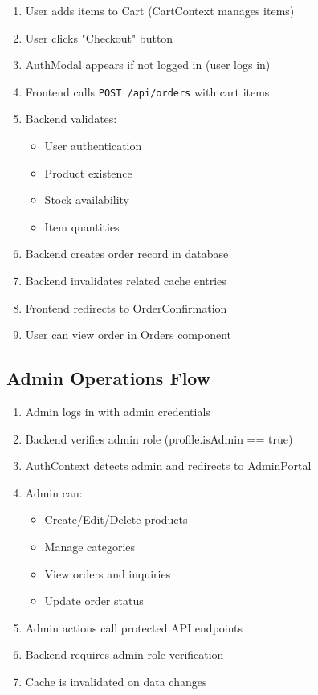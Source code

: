 \documentclass[12pt,a4paper]{report}
\begin{document}
\begin{enumerate}
    \item User adds items to Cart (CartContext manages items)
    \item User clicks "Checkout" button
    \item AuthModal appears if not logged in (user logs in)
    \item Frontend calls \texttt{POST /api/orders} with cart items
    \item Backend validates:
        \begin{itemize}
            \item User authentication
            \item Product existence
            \item Stock availability
            \item Item quantities
        \end{itemize}
    \item Backend creates order record in database
    \item Backend invalidates related cache entries
    \item Frontend redirects to OrderConfirmation
    \item User can view order in Orders component
\end{enumerate}

\subsection{Admin Operations Flow}

\begin{enumerate}
    \item Admin logs in with admin credentials
    \item Backend verifies admin role (profile.isAdmin == true)
    \item AuthContext detects admin and redirects to AdminPortal
    \item Admin can:
        \begin{itemize}
            \item Create/Edit/Delete products
            \item Manage categories
            \item View orders and inquiries
            \item Update order status
        \end{itemize}
    \item Admin actions call protected API endpoints
    \item Backend requires admin role verification
    \item Cache is invalidated on data changes
\end{enumerate}
\end{document}
